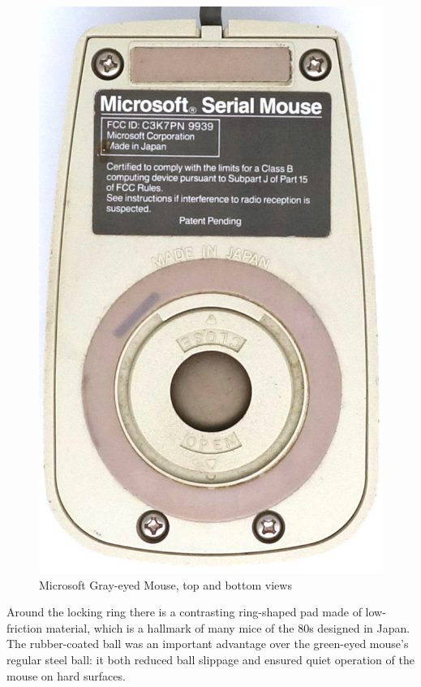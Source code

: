 \documentclass[11pt, a4paper]{article}
\begin{document}
\begin{figure}[h]
    \includegraphics[scale=0.7]{1985_microsoft_gray_eyed_mouse/bottom_30.jpg}
    \caption{Microsoft Gray-eyed Mouse, top and bottom views}
    \label{fig:MicrosoftGrayEyedTopAndBottom}
\end{figure}

Around the locking ring there is a contrasting ring-shaped pad made of low-friction material, which is a hallmark of many mice of the 80s designed in Japan. The rubber-coated ball was an important advantage over the green-eyed mouse's regular steel ball: it both reduced ball slippage and ensured quiet operation of the mouse on hard surfaces.
\end{document}
